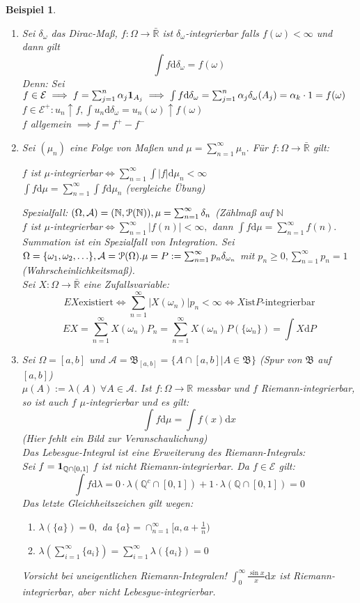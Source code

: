 \documentclass[a4paper,11pt]{book}
\newcommand{\R}{{\mathbb R}}
\newcommand{\N}{{\mathbb N}}
\newcommand{\Q}{{\mathbb Q}}
\newcommand{\ind}{\text{\bf{1}}}
\def\AA{ \mathcal{A} }
\def\PM{ \EuScript{P} }
\def\EE{ \mathcal{E} }
\def\BB{ \mathfrak{B} }
\def\folgt{\ensuremath{\implies}}
\def\equizu{\ensuremath{\iff}}
\def\d{\mbox{d}}
\newtheorem{Bsp}{Beispiel}[chapter]
\theoremstyle{nonumberplain}
\begin{document}
\begin{Bsp} \label{Bsp1.2}
\begin{enumerate}
\item[a)] Sei $\delta_\omega$ das Dirac-Maß, $f:\Omega\to\bar\R$ ist $\delta_\omega$-integrierbar falls $f(\omega)<\infty$ und dann gilt
$$\int f\mbox{d}\delta_\omega=f(\omega)$$
Denn: Sei $f\in\EE\folgt f=\sum_{j=1}^n \alpha_j \ind_{A_j}\folgt \int f\d\delta_\omega=\sum_{j=1}^n\alpha_j\delta_\omega(A_j)=\alpha_k\cdot 1=f(\omega)$\\
$f\in\EE^+:u_n\uparrow f, \int u_n\d\delta_\omega=u_n(\omega)\uparrow f(\omega)$\\
$f$ allgemein $\folgt f=f^+-f^-$
\item[b)] Sei $(\mu_n)$ eine Folge von Maßen und $\mu=\sum_{n=1}^\infty\mu_n.$ Für $f:\Omega\to\bar\R$ gilt:
\begin{center}
$f$ ist $\mu$-integrierbar$\equizu\sum_{n=1}^\infty\int |f|\d\mu_n<\infty$\\
$\int f\d\mu = \sum_{n=1}^\infty\int f\d\mu_n$ (vergleiche Übung)
\end{center}
Spezialfall: $(\Omega, \AA)=(\N,\PM(\N)), \mu=\sum_{n=1}^\infty\delta_n$ (Zählmaß auf $\N$\\
$f$ ist $\mu$-integrierbar$\equizu\sum_{n=1}^\infty|f(n)|<\infty,$ dann $\int f\d\mu=\sum_{n=1}^\infty f(n).$\\
Summation ist ein Spezialfall von Integration. 
Sei $\Omega=\{\omega_1, \omega_2, \ldots\}, \AA=\PM(\Omega). \mu=P:=\sum_{n=1}^\infty p_n\delta_{\omega_n}$ mit $p_n\ge 0, \sum_{n=1}^\infty p_n=1$ (Wahrscheinlichkeitsmaß).\\
Sei $X:\Omega\to\bar\R$ eine Zufallsvariable:
$$EX \text{existiert} \equizu \sum_{n=1}^\infty|X(\omega_n)|p_n<\infty\equizu X \text{ist} P\text{-integrierbar}$$
$$EX = \sum_{n=1}^\infty X(\omega_n)P_n=\sum_{n=1}^\infty X(\omega_n)P(\{\omega_n\})=\int X\d P$$
\item[c)] Sei $\Omega=[a,b]$ und $\AA=\BB_{[a,b]}=\{A\cap [a,b]|A\in\BB\}$ (Spur von $\BB$ auf $[a,b]$)\\
$\mu(A):=\lambda(A)\ \forall A\in\AA.$ Ist $f:\Omega\to\R$ messbar und $f$ Riemann-integrierbar, so ist auch $f$ $\mu$-integrierbar und es gilt:
$$\int f\d\mu=\int f(x)\d x$$
(Hier fehlt ein Bild zur Veranschaulichung)\\
Das Lebesgue-Integral ist eine Erweiterung des Riemann-Integrals:\\
Sei $f=\ind_{\Q\cap [0,1]}$ $f$ ist nicht Riemann-integrierbar. Da $f\in\EE$ gilt:
$$\int f\d\lambda=0\cdot\lambda(\Q^c\cap[0,1])+1\cdot\lambda(\Q\cap[0,1])=0$$
Das letzte Gleichheitszeichen gilt wegen:
\begin{enumerate}
\item[(i)] $\lambda(\{a\})=0,$ da $\{a\}=\cap_{n=1}^\infty[a,a+\frac{1}{n})$
\item[(ii)] $\lambda(\sum_{i=1}^\infty\{a_i\})=\sum_{i=1}^\infty\lambda(\{a_i\})=0$
\end{enumerate}
Vorsicht bei uneigentlichen Riemann-Integralen! $\int_0^\infty\frac{\sin x}{x}\d x$ ist Riemann-integrierbar, aber nicht Lebesgue-integrierbar.
\end{enumerate}
\end{Bsp}
\end{document}
